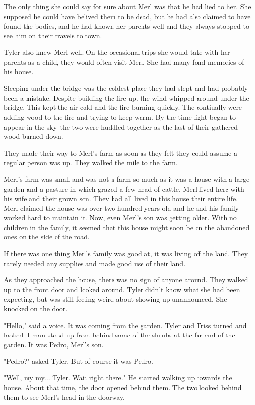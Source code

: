 \documentclass[courier]{sffms}
\begin{document}
The only thing she could say for sure about Merl was
that he had lied to her. She supposed he could have
belived them to be dead, but he had also claimed to
have found the bodies, and he had known her parents
well and they always stopped to see him on their
travels to town.

Tyler also knew Merl well. On the occasional trips she
would take with her parents as a child, they would
often visit Merl. She had many fond memories of his
house.

Sleeping under the bridge was the coldest place they
had slept and had probably been a mistake. Despite
building the fire up, the wind whipped around under
the bridge. This kept the air cold and the fire burning
quickly. The contiually were adding wood to the fire
and trying to keep warm. By the time light began to
appear in the sky, the two were huddled together
as the last of their gathered wood burned down.

They made their way to Merl's farm as soon as
they felt they could assume a regular person
was up. They walked the mile to the farm.

Merl's farm was small and was not a farm
so much as it was a house with a large garden
and a pasture in which grazed a few head
of cattle. Merl lived here with his wife and
their grown son. They had all lived in this
house their entire life. Merl claimed the house
was over two hundred years old and he and
his family worked hard to maintain it. Now,
even Merl's son was getting older. With no
children in the family, it seemed that this house
might soon be on the abandoned ones on the side
of the road.

If there was one thing Merl's family was good at,
it was living off the land. They rarely needed
any supplies and made good use of their land.

As they approached the house, there was no
sign of anyone around. They walked up to the
front door and looked around. Tyler didn't know
what she had been expecting, but was still feeling
weird about showing up unannounced. She knocked
on the door.

"Hello," said a voice. It was coming from the garden.
Tyler and Triss turned and looked. I man stood up
from behind some of the shrubs at the far end of the
garden. It was Pedro, Merl's son.

"Pedro?" asked Tyler. But of course it was Pedro.

"Well, my my... Tyler. Wait right there." He started
walking up towards the house. About that time, the
door opened behind them. The two looked behind them
to see Merl's head in the doorway.
\end{document}
